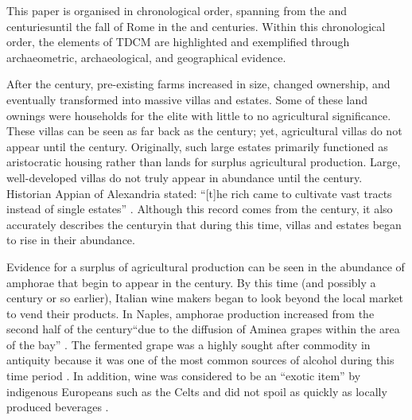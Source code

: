 This paper is organised in chronological order, spanning from the  and  centuries\BC until the fall of Rome in the  and  centuries\AD. Within this chronological order, the elements of TDCM are highlighted and exemplified through archaeometric, archaeological, and geographical evidence.


After  the  century\BC, pre-existing farms increased in size, changed ownership, and eventually transformed into massive villas and estates. Some of these land ownings were households for the elite with little to no agricultural significance. These villas can be seen as far back as the  century\BC; yet, agricultural villas do not appear until the  century\BC \parencite[18]{Terrenato_2001}. 
Originally, such large estates primarily functioned as aristocratic housing rather than lands for surplus agricultural production. Large, well-developed villas do not truly appear in abundance until the  century\BC \parencite[24]{Terrenato_2001}. 
Historian Appian of Alexandria stated: “[t]he rich came to cultivate vast tracts instead of single estates” \parencite[98]{Potter_1990}. 
Although this record comes from the  century\AD, it also accurately describes the  century\BC in that during this time, villas and estates began to rise in their abundance.

Evidence for a surplus of agricultural production can be seen in the abundance of amphorae that begin to appear in the  century\BC. 
By this time (and possibly a century or so earlier), Italian wine makers began to look beyond the local market to vend their products. 
In Naples, amphorae production increased from the second half of the  century\BC “due to the diffusion of Aminea grapes within the area of the bay” \parencite[61]{Olcese_2005}. The fermented grape was a highly sought after commodity in antiquity because it was one of the most common sources of alcohol during this time period \parencite[2]{Purcell_1985}. In addition, wine was considered to be an “exotic item” by indigenous Europeans such as the Celts and did not spoil as quickly as locally produced beverages \parencite[383]{Dietler_1990}. 


